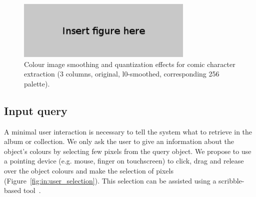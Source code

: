

  \begin{figure}[h!]  %
    \centering
    \includegraphics[trim= 0px 0px 0px 0px, clip, width=0.75\textwidth]{figure_here.png}
    \caption[Colour image smoothing and quantization for comic character extraction]{Colour image smoothing and quantization effects for comic character extraction (3 columns, original, l0-smoothed, corresponding 256 palette).}
    \label{fig:in:smoothing_quantization}
  \end{figure}




\subsection{Input query}
\label{sec:in:input_query}
A minimal user interaction is necessary to tell the system what to retrieve in the album or collection.
We only ask the user to give an information about the object's colours by selecting few pixels from the query object.
We propose to use a pointing device (e.g. mouse, finger on touchscreen) to click, drag and release over the object colours and make the selection of pixels (Figure~\ref{fig:in:user_selection}).
This selection can be assisted using a scribble-based tool~\cite{Xu2012LazySelection}.

